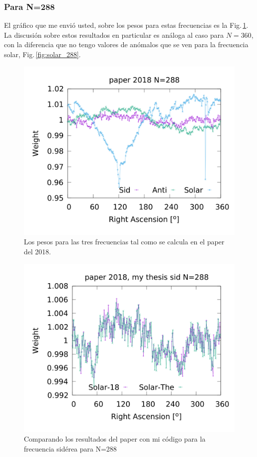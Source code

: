 	\subsubsection{Para N=288}

	El gráfico que me envió usted, sobre los pesos para estas frecuencias es la Fig.\,\ref{fig:all_288_paper}. La discusión sobre estos resultados en particular es análoga al caso para $N=360$, con la diferencia que no tengo valores de anómalos que se ven para la frecuencia solar, Fig.\,\ref{fig:solar_288}.
	\begin{figure}[H]
	\centering
	\includegraphics[width=\linewidth]{Graficos/solar_anti_sid_paper2018_in_288.png}
	\caption{Los pesos para las tres frecuencias tal como se calcula en el paper del 2018.}
	\label{fig:all_288_paper}
	\end{figure}


	\begin{figure}[H]
	\centering
	\includegraphics[width=\linewidth]{Graficos/sidereal_my_and_paper_in_288.png}
	\caption{Comparando los resultados del paper con mi código para la frecuencia sidérea para N=288}
	\label{fig:sidereal_288}
	\end{figure}


